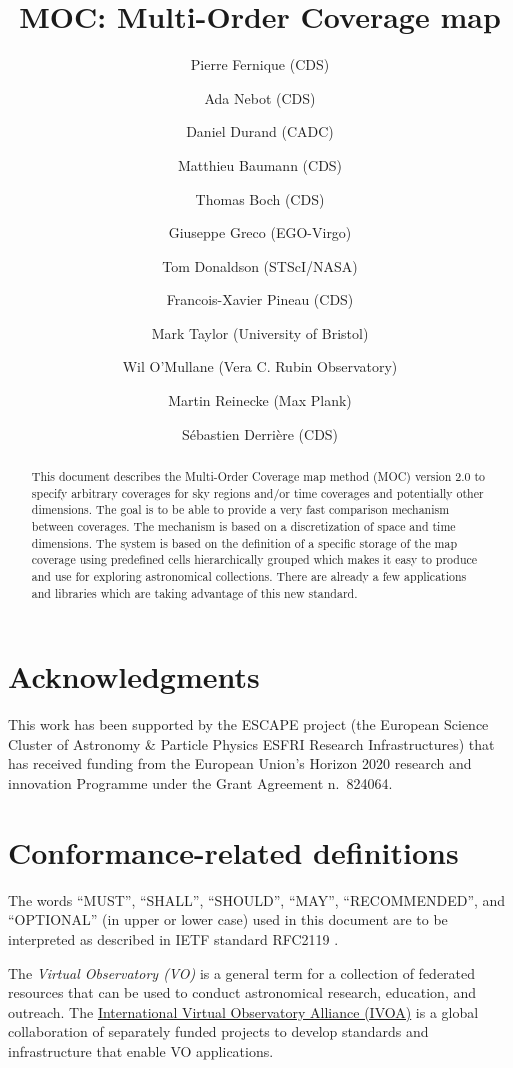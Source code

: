 \documentclass[11pt,a4paper]{ivoa}
\title{MOC: Multi-Order Coverage map}
\author[http://www.ivoa.net/twiki/bin/view/IVOA/PierreFernique]{Pierre Fernique (CDS)}
\author[http://www.ivoa.net/twiki/bin/view/IVOA/AdaNebot]{Ada Nebot (CDS)}
\author[http://www.ivoa.net/twiki/bin/view/IVOA/DanielDurand]{Daniel Durand (CADC)} \author{Matthieu Baumann (CDS)}
\author[http://www.ivoa.net/twiki/bin/view/IVOA/ThomasBoch]{Thomas Boch (CDS)} \author{Giuseppe Greco (EGO-Virgo)}
\author[http://www.ivoa.net/twiki/bin/view/IVOA/TomDonaldson]{Tom Donaldson (STScI/NASA)}
\author{Francois-Xavier Pineau (CDS)}
\author[http://www.ivoa.net/twiki/bin/view/IVOA/MarkTaylor]{Mark Taylor (University of Bristol)}
\author{Wil O'Mullane (Vera C. Rubin Observatory)}
\author{Martin Reinecke (Max Plank)}
\author{S\'{e}bastien Derri\`{e}re (CDS)}
\begin{document}
\begin{abstract}
This document describes the Multi-Order Coverage map method (MOC)
version 2.0 to specify arbitrary coverages for sky regions and/or time
coverages and potentially other dimensions. The goal is to be able to
provide a very fast comparison mechanism between coverages. The
mechanism is based on a discretization of space and time
dimensions. The system is based on the definition of a specific storage
of the map coverage using predefined cells hierarchically grouped
which makes it easy to produce and use for exploring astronomical
collections. There are already a few applications and libraries which
are taking advantage of this new standard. 
\end{abstract}

\listoffigures
\listoftables  


\section*{Acknowledgments}
This work has been supported by the ESCAPE project (the European
Science Cluster of Astronomy \& Particle Physics ESFRI Research
Infrastructures) that has received funding from the European Union's
Horizon 2020 research and innovation Programme under the Grant
Agreement n.\ 824064.

\section*{Conformance-related definitions}
The words ``MUST'', ``SHALL'', ``SHOULD'', ``MAY'', ``RECOMMENDED'',
and ``OPTIONAL'' (in upper or lower case) used in this document are to
be interpreted as described in IETF standard RFC2119
\citep{std:RFC2119}.

The \emph{Virtual Observatory (VO)} is a general term for a collection
of federated resources that can be used to conduct astronomical
research, education, and outreach.  The
\href{http://www.ivoa.net}{International Virtual Observatory Alliance
  (IVOA)} is a global collaboration of separately funded projects to
develop standards and infrastructure that enable VO applications.
\end{document}
